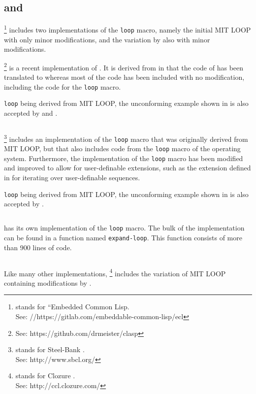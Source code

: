 \subsection{\ecl{} and \clasp{}}

\ecl{}%
\footnote{\ecl{} stands for ``Embedded Common Lisp.\\
See: //https://gitlab.com/embeddable-common-lisp/ecl}
includes two implementations of the \texttt{loop} macro, namely
the initial MIT LOOP with only minor modifications, and the variation
by \symbolics{} also with minor modifications.

\clasp{}%
\footnote{See: https://github.com/drmeister/clasp}
is a recent implementation of \commonlisp{}.  It is derived
from \ecl{} in that the \clanguage{} code of \ecl{} has been
translated to \cplusplus{} whereas most of the \commonlisp{} code has
been included with no modification, including the code for the
\texttt{loop} macro.

\ecl{} \texttt{loop} being derived from MIT LOOP, the unconforming
example shown in  is also accepted by \ecl{} and
\clasp{}.

\subsection{\sbcl{}}

\sbcl{}%
\footnote{\sbcl{} stands for Steel-Bank \commonlisp{}.\\
See: http://www.sbcl.org/}
includes an implementation of the \texttt{loop} macro that was
originally derived from MIT LOOP, but that also includes code from the
\texttt{loop} macro of the \genera{} operating system.  Furthermore,
the \sbcl{} implementation of the \texttt{loop} macro has been
modified and improved to allow for user-definable extensions, such as
the extension defined in \cite{Rhodes:2007:USC:1622123.1622138} for
iterating over user-definable sequences.

\sbcl{} \texttt{loop} being derived from MIT LOOP, the unconforming
example shown in  is also accepted by \sbcl{}.

\subsection{\clisp{}}

\clisp{} has its own implementation of the \texttt{loop} macro.  The
bulk of the implementation can be found in a function named
\texttt{expand-loop}.  This function consists of more than $900$ lines
of code.

\subsection{\ccl{}}

Like many other implementations, \ccl{}%
\footnote{\ccl{} stands for Clozure \commonlisp.\\
See: http://ccl.clozure.com/}
includes the variation of MIT
LOOP containing modifications by \symbolics{}.
